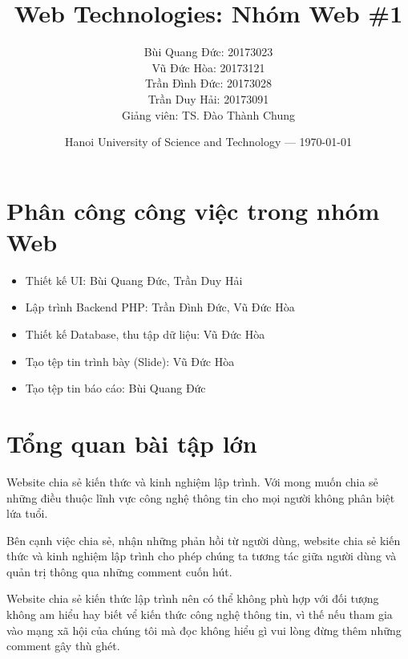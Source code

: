 \documentclass{article}
\title{Web Technologies: Nhóm Web  \#1} %
\author{Bùi Quang Đức: 20173023 \\ Vũ Đức Hòa: 20173121 \\ Trần Đình Đức: 20173028 \\ Trần Duy Hải: 20173091 \\ Giảng viên: TS. Đào Thành Chung}} %
\date{Hanoi University of Science and Technology --- \today} %
\begin{document}
\maketitle %


\section*{Phân công công việc trong nhóm Web}

\begin{itemize}
\item Thiết kế UI: Bùi Quang Đức, Trần Duy Hải
\item Lập trình Backend PHP: Trần Đình Đức, Vũ Đức Hòa
\item Thiết kế Database, thu tập dữ liệu: Vũ Đức Hòa
\item Tạo tệp tin trình bày (Slide): Vũ Đức Hòa
\item Tạo tệp tin báo cáo: Bùi Quang Đức
\end{itemize}


\section*{Tổng quan bài tập lớn} %

Website chia sẻ kiến thức và kinh nghiệm lập trình. Với mong muốn chia sẻ những điều thuộc lĩnh vực công nghệ thông tin cho mọi người không phân biệt lứa tuổi.

Bên cạnh việc chia sẻ, nhận những phản hồi từ người dùng, website chia sẻ kiến thức và kinh nghiệm lập trình cho phép chúng ta tương tác giữa người dùng và quản trị thông qua những comment cuốn hút.

\begin{info}[Lưu ý:] %
Website chia sẻ kiến thức lập trình nên có thể không phù hợp với đối tượng không am hiểu hay biết vể kiến thức công nghệ thông tin, vì thế nếu tham gia vào mạng xã hội của chúng tôi mà đọc không hiểu gì vui lòng đừng thêm những comment gây thù ghét.
\end{info}

\end{document}
